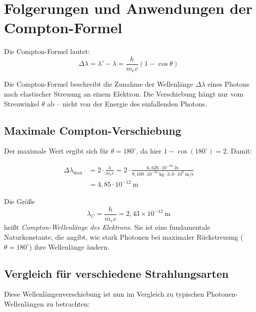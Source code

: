 \section{Folgerungen und Anwendungen der Compton-Formel}

Die Compton-Formel lautet:
\[
\Delta \lambda = \lambda' - \lambda = \frac{h}{m_e c}(1 - \cos\theta)
\]

\begin{PhysikBox}
	Die Compton-Formel beschreibt die Zunahme der Wellenlänge \(\Delta \lambda\)
	eines Photons nach elastischer Streuung an einem Elektron. 
	Die Verschiebung hängt nur vom Streuwinkel \(\theta\) ab – 
	nicht von der Energie des einfallenden Photons.
\end{PhysikBox}



\subsection*{Maximale Compton-Verschiebung}

Der maximale Wert ergibt sich für \( \theta = 180^\circ \), da hier \( 1 - \cos(180^\circ) = 2 \). Damit:

\begin{align*}
	\Delta \lambda_\text{max} &= 2 \cdot \frac{h}{m_e c}
	= 2 \cdot \frac{6{,}626 \cdot 10^{-34}~\text{Js}}{9{,}109 \cdot 10^{-31}~\text{kg} \cdot 3{,}0 \cdot 10^8~\text{m/s}}\\
	&= 4{,}85 \cdot 10^{-12}~\text{m}
\end{align*}



\begin{DidaktikBox}
	Die Größe
	\[
	\lambda_C = \frac{h}{m_e c} = 2{,}43 \times 10^{-12}~\text{m}
	\]
	heißt \emph{Compton-Wellenlänge des Elektrons}.  
	Sie ist eine fundamentale Naturkonstante, die angibt, 
	wie stark Photonen bei maximaler Rückstreuung (\(\theta=180^\circ\)) 
	ihre Wellenlänge ändern.
\end{DidaktikBox}


\subsection*{Vergleich für verschiedene Strahlungsarten}

Diese Wellenlängenverschiebung ist nun im Vergleich zu typischen Photonen-Wellenlängen zu betrachten:

